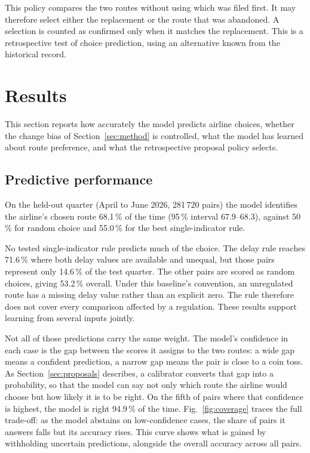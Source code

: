 \documentclass[conference,10pt,a4paper,IEEEoverridecommandlockouts]{IEEEtran}
\begin{document}
This policy compares the two routes without using which was filed first.
It may therefore select either the replacement or the route that was
abandoned. A selection is counted as confirmed only when it matches the
replacement. This is a retrospective test of choice prediction, using an
alternative known from the historical record.

\section{Results}
\label{sec:results}

This section reports how accurately the model predicts airline choices,
whether the change bias of Section~\ref{sec:method} is controlled, what
the model has learned about route preference, and what the retrospective proposal policy selects.

\subsection{Predictive performance}

On the held-out quarter (April to June 2026, 281\,720 pairs) the model
identifies the airline's chosen route 68.1\,\% of the time (95\,\%
interval 67.9--68.3), against 50\,\% for random choice and 55.0\,\% for
the best single-indicator rule.

No tested single-indicator rule predicts much of the choice. The delay
rule reaches 71.6\,\% where both delay values are available and unequal,
but those pairs represent only 14.6\,\% of the test quarter. The other
pairs are scored as random choices, giving 53.2\,\% overall. Under
this baseline's convention, an unregulated route has a missing delay
value rather than an explicit zero. The rule therefore does not cover
every comparison affected by a regulation. These results support
learning from several inputs jointly.

Not all of those predictions carry the same weight. The model's
confidence in each case is the gap between the scores it assigns to the
two routes: a wide gap means a confident prediction, a narrow gap means
the pair is close to a coin toss. As Section~\ref{sec:proposals}
describes, a calibrator converts that gap into a probability, so that
the model can say not only which route the airline would choose but how
likely it is to be right. On the fifth of
pairs where that confidence is highest, the model is right 94.9\,\% of
the time. Fig.~\ref{fig:coverage} traces the full trade-off: as the
model abstains on low-confidence cases, the share of pairs it answers falls but its accuracy rises. This curve
shows what is gained by withholding uncertain predictions, alongside
the overall accuracy across all pairs.
\end{document}
